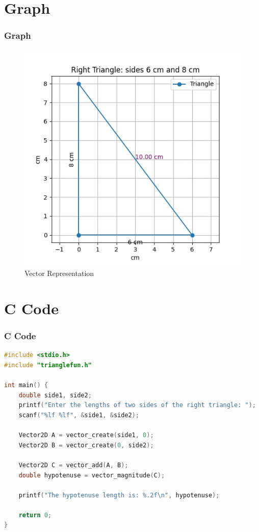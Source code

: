 \documentclass{beamer}
\theoremstyle{remark}
\numberwithin{equation}{section}
\begin{document}
\section{Graph}
\begin{frame}
    \frametitle{Graph}
    \begin{figure}[htbp]
    \centering
    \includegraphics[width=0.65\linewidth]{FIG/fig1.png}
    \caption{Vector Representation}
    \label{fig:FIG/fig1.png}
\end{figure}
\end{frame}
\section{ C Code}
\begin{frame}[fragile]
\frametitle{C Code }
\begin{lstlisting}[language=C]
#include <stdio.h>
#include "trianglefun.h"

int main() {
    double side1, side2;
    printf("Enter the lengths of two sides of the right triangle: ");
    scanf("%lf %lf", &side1, &side2);

    Vector2D A = vector_create(side1, 0);
    Vector2D B = vector_create(0, side2);

    Vector2D C = vector_add(A, B);
    double hypotenuse = vector_magnitude(C);

    printf("The hypotenuse length is: %.2f\n", hypotenuse);

    return 0;
}

    
\end{lstlisting}
\end{frame}
\end{document}
